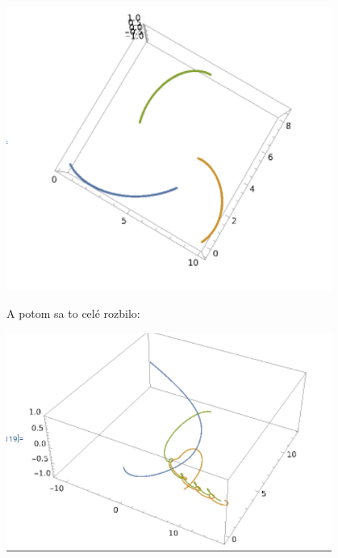 \documentclass[a4paper]{article}
\begin{document}
	 \centerline{\includegraphics[width=0.8\textwidth]{pohyb_8}}
	
	A potom sa to celé rozbilo:
	
	\centerline{\includegraphics[width=0.8\textwidth]{pohyb_9}}
\end{document}

